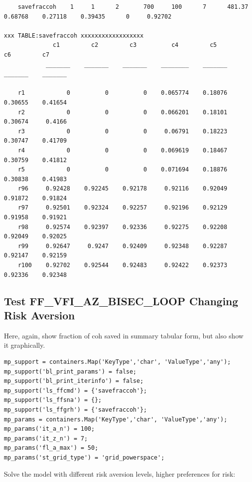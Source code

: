 \documentclass[
]{book}
\begin{document}
\begin{verbatim}
    savefraccoh    1     1      2       700     100      7      481.37    0.68768    0.27118    0.39435      0     0.92702

xxx TABLE:savefraccoh xxxxxxxxxxxxxxxxxx
              c1         c2         c3          c4         c5         c6         c7   
            _______    _______    _______    ________    _______    _______    _______

    r1            0          0          0    0.065774    0.18076    0.30655    0.41654
    r2            0          0          0    0.066201    0.18101    0.30674     0.4166
    r3            0          0          0     0.06791    0.18223    0.30747    0.41709
    r4            0          0          0    0.069619    0.18467    0.30759    0.41812
    r5            0          0          0    0.071694    0.18876    0.30838    0.41983
    r96     0.92428    0.92245    0.92178     0.92116    0.92049    0.91872    0.91824
    r97     0.92501    0.92324    0.92257     0.92196    0.92129    0.91958    0.91921
    r98     0.92574    0.92397    0.92336     0.92275    0.92208    0.92049    0.92025
    r99     0.92647     0.9247    0.92409     0.92348    0.92287    0.92147    0.92159
    r100    0.92702    0.92544    0.92483     0.92422    0.92373    0.92336    0.92348
\end{verbatim}

\hypertarget{test-ff_vfi_az_bisec_loop-changing-risk-aversion}{%
\subsection{Test FF\_VFI\_AZ\_BISEC\_LOOP Changing Risk Aversion}\label{test-ff_vfi_az_bisec_loop-changing-risk-aversion}}

Here, again, show fraction of coh saved in summary tabular form, but
also show it graphically.

\begin{verbatim}
mp_support = containers.Map('KeyType','char', 'ValueType','any');
mp_support('bl_print_params') = false;
mp_support('bl_print_iterinfo') = false;
mp_support('ls_ffcmd') = {'savefraccoh'};
mp_support('ls_ffsna') = {};
mp_support('ls_ffgrh') = {'savefraccoh'};
mp_params = containers.Map('KeyType','char', 'ValueType','any');
mp_params('it_a_n') = 100;
mp_params('it_z_n') = 7;
mp_params('fl_a_max') = 50;
mp_params('st_grid_type') = 'grid_powerspace';
\end{verbatim}

Solve the model with different risk aversion levels, higher preferences
for risk:
\end{document}
